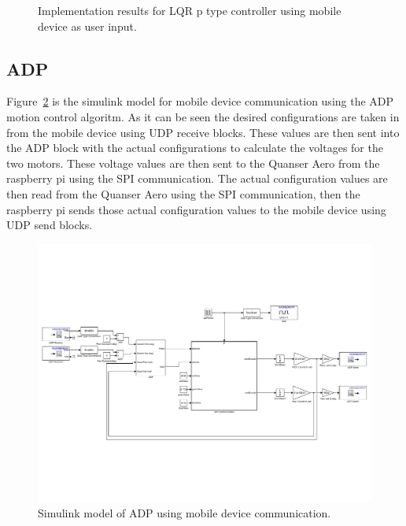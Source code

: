 \begin{figure}
{    \label{fig:AndroidLQRPitchVolt}
    }
    \caption{Implementation results for LQR p type controller using mobile device as user input.}
    \label{fig:AndroidLQR}
\end{figure}


\subsection{ADP}
Figure~\ref{fig:ADP_Android} is the simulink model for mobile device communication using the ADP motion control algoritm.  As it can be seen the desired configurations are taken in from the mobile device using UDP receive blocks.  These values are then sent into the ADP block with the actual configurations to calculate the voltages for the two motors.  These voltage values are then sent to the Quanser Aero from the raspberry pi using the SPI communication.  The actual configuration values are then read from the Quanser Aero using the SPI communication, then the raspberry pi sends those actual configuration values to the mobile device using UDP send blocks.
\begin{figure}[!htbp]
    \centering
    \includegraphics[width=.72\textwidth,keepaspectratio=true]{figs/img/ADP_Android}
    \caption{Simulink model of ADP using mobile device communication.}
    \label{fig:ADP_Android}
\end{figure}

